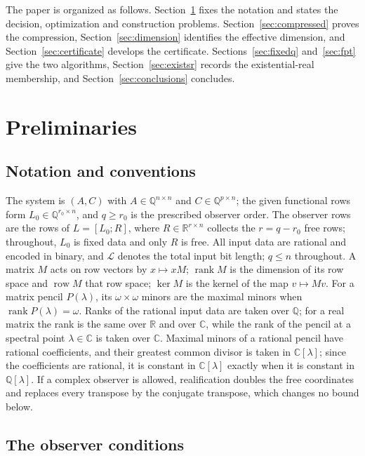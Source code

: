\documentclass[journal]{IEEEtran}
\theoremstyle{plainn}
\begin{document}
The paper is organized as follows. Section~\ref{sec:prelim} fixes the notation and states
the decision, optimization and construction problems. Section~\ref{sec:compressed} proves
the compression, Section~\ref{sec:dimension} identifies the effective dimension, and
Section~\ref{sec:certificate} develops the certificate. Sections~\ref{sec:fixedq}
and~\ref{sec:fpt} give the two algorithms, Section~\ref{sec:existsr} records the
existential-real membership, and Section~\ref{sec:conclusions} concludes.

\section{Preliminaries}\label{sec:prelim}

\subsection{Notation and conventions}\label{sec:notation}

The system is $(A,C)$ with $A\in\mathbb Q^{n\times n}$ and $C\in\mathbb Q^{p\times n}$;
the given functional rows form $L_0\in\mathbb Q^{r_0\times n}$, and $q\ge r_0$ is the
prescribed observer order. The observer rows are the rows of $L=[L_0;R]$, where
$R\in\mathbb R^{r\times n}$ collects the $r=q-r_0$ free rows; throughout, $L_0$ is fixed
data and only $R$ is free. All input data are rational and encoded in binary, and
$\mathcal L$ denotes the total input bit length; $q\le n$ throughout. A matrix $M$ acts on
row vectors by $x\mapsto xM$; $\operatorname{rank}M$ is the dimension of its row space and
$\operatorname{row}M$ that row space; $\ker M$ is the kernel of the map $v\mapsto Mv$. For
a matrix pencil $P(\lambda)$, its $\omega\times\omega$ minors are the maximal minors when
$\operatorname{rank}P(\lambda)=\omega$. Ranks of the rational input data are taken over
$\mathbb Q$; for a real matrix the rank is the same over $\mathbb R$ and over $\mathbb C$,
while the rank of the pencil at a spectral point $\lambda\in\mathbb C$ is taken over
$\mathbb C$. Maximal minors of a rational pencil have rational coefficients, and their
greatest common divisor is taken in $\mathbb C[\lambda]$; since the coefficients are
rational, it is constant in $\mathbb C[\lambda]$ exactly when it is constant in
$\mathbb Q[\lambda]$. If a complex observer is allowed, realification doubles the free
coordinates and replaces every transpose by the conjugate transpose, which changes no
bound below.

\subsection{The observer conditions}\label{sec:conditions}
\end{document}
